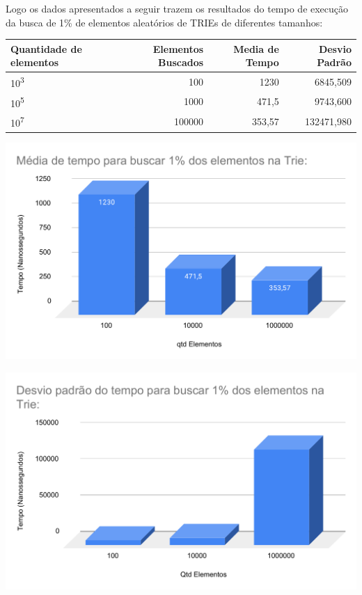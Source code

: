 Logo os dados apresentados a seguir trazem os resultados do tempo de execução da
busca de 1\% de elementos aleatórios de TRIEs de diferentes tamanhos:

\begin{center}
        \begin{tabular}{| l | r | r | r | }
            \hline
            Quantidade de elementos & Elementos Buscados & Media de Tempo & Desvio Padrão\\
            \hline
            10\textsuperscript{3} & 100 & 1230 & 6845,509\\
            10\textsuperscript{5} & 1000 & 471,5 & 9743,600\\
            10\textsuperscript{7} & 100000 & 353,57 & 132471,980\\
            \hline
        \end{tabular}
    \end{center}

\begin{center}
            \includegraphics[scale=0.7]{Trabalho AED/fig/MediaTrie.pdf}
            \label{fig:Media de tempo Trie}
    \end{center}
    
\begin{center}
            \includegraphics[scale=0.7]{Trabalho AED/fig/DesvioTrie.pdf}
            \label{fig:Media de tempo Trie}
    \end{center}


